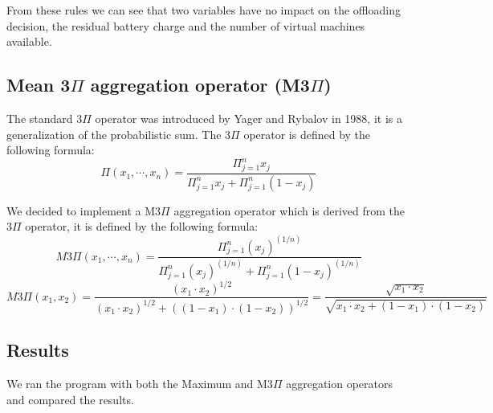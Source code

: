 From these rules we can see that two variables have no impact on the offloading decision, the residual battery charge and the number of virtual
machines available.

\subsection{Mean 3\texorpdfstring{$\Pi$}{Pi} aggregation operator (M3\texorpdfstring{$\Pi$}{Pi})}

The standard 3$\Pi$ operator was introduced by Yager and Rybalov \cite{yager-rybalov-1998} in 1988, it is a generalization of the probabilistic sum.
The 3$\Pi$ operator is defined by the following formula:
\begin{equation}
	\Pi(x_1, \cdots, x_n) = \frac{\Pi_{j=1}^n x_j}{\Pi_{j=1}^n x_j + \Pi_{j=1}^n (1 - x_j)}
\end{equation}

We decided to implement a M3$\Pi$ aggregation operator which is derived from the 3$\Pi$ operator, it is defined by the following formula:
\begin{equation}
	M3\Pi(x_1, \cdots, x_n) = \frac{\Pi_{j=1}^n (x_j)^{(1/n)}}{\Pi_{j=1}^n (x_j)^{(1/n)} + \Pi_{j=1}^n (1 - x_j)^{(1/n)}}
\end{equation}
\begin{equation}
	M3\Pi(x_1, x_2) = \frac{(x_1 \cdot x_2)^{1/2}}{(x_1 \cdot x_2)^{1/2} + ((1 - x_1) \cdot (1 - x_2))^{1/2}} = \frac{\sqrt{x_1 \cdot x_2}}{\sqrt{x_1 \cdot x_2 + (1 - x_1) \cdot (1 - x_2)}}
\end{equation}

\subsection{Results}

We ran the program with both the Maximum and M3$\Pi$ aggregation operators and compared the results.

